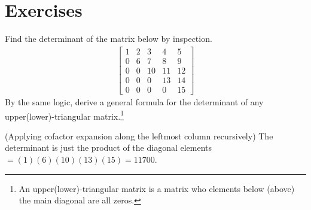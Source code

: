 \section{Exercises}

\begin{Exercise}
Find the determinant of the matrix below by inspection.
\begin{align*}
\begin{bmatrix}
1 & 2 & 3 & 4 & 5 \\
0 & 6 & 7 & 8 & 9 \\
0 & 0 & 10 & 11 & 12 \\
0 & 0 & 0 & 13 & 14 \\
0 & 0 & 0 & 0 & 15
\end{bmatrix}    
\end{align*}
By the same logic, derive a general formula for the determinant of any upper(lower)-triangular matrix.\footnote{An upper(lower)-triangular matrix is a matrix who elements below (above) the main diagonal are all zeros.}
\end{Exercise}
\begin{Answer}
(Applying cofactor expansion along the leftmost column recursively) The determinant is just the product of the diagonal elements $= (1)(6)(10)(13)(15) = 11700$.    
\end{Answer}


